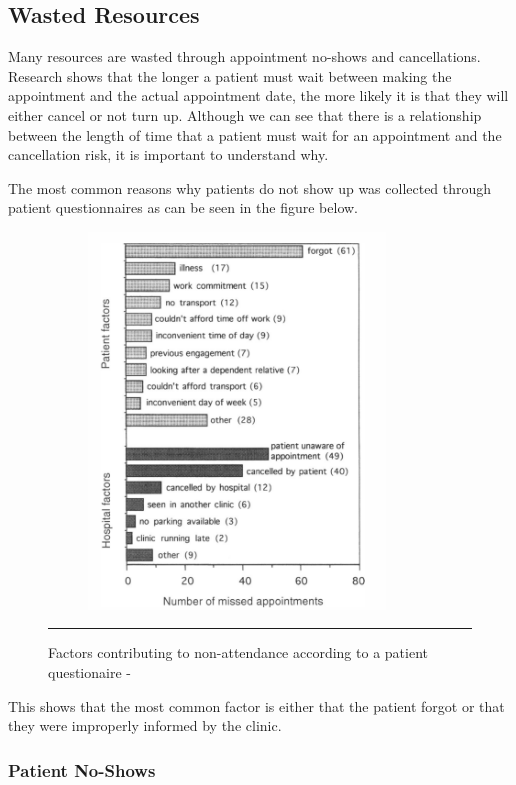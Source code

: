 \subsection{Wasted Resources}

Many resources are wasted through appointment no-shows and cancellations. Research shows that the longer a patient must wait between making the appointment and the actual appointment date, the more likely it is that they will either cancel or not turn up\cite{Gallucci}. Although we can see that there is a relationship between the length of time that a patient must wait for an appointment and the cancellation risk, it is important to understand why.

The most common reasons why patients do not show up was collected through patient questionnaires as can be seen in the figure below.

\begin{figure}[htbp]
	\centering	\includegraphics[width=10cm,height=10cm,keepaspectratio]{Figures/MissedAppointmentsStoneEtAl.png}
		\rule{35em}{0.5pt}
	\caption[Factors contributing to non-attendance according to a patient questionaire - \cite{Stone}]{Factors contributing to non-attendance according to a patient questionaire - \cite{Stone}}
	\label{fig:NonAttendance}
\end{figure}

This shows that the most common factor is either that the patient forgot or that they were improperly informed by the clinic.

\subsubsection{Patient No-Shows}

